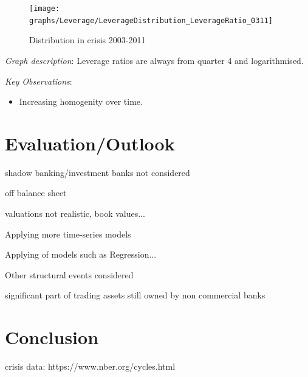 \documentclass[12pt, a4paper]{article} %
\begin{document}
\pagebreak


\begin{figure}[hbtp]
\centering
\caption{Distribution in crisis 2003-2011}
\texttt{[image: graphs/Leverage/LeverageDistribution\_LeverageRatio\_0311]}
\end{figure}

\noindent \textit{Graph description}: Leverage ratios are always from quarter 4 and  logarithmised.

\noindent \textit{Key Observations}:
\begin{itemize}
\item Increasing homogenity over time.
\end{itemize}

\section{Evaluation/Outlook}

shadow banking/investment banks not considered

off balance sheet

valuations not realistic, book values...

Applying more time-series models

Applying of models such as Regression...

Other structural events considered

significant part of trading assets still owned by non commercial banks

\section{Conclusion}





\newpage
\printbibliography[
heading=bibintoc,
title={Bibliography}
]

crisis data: https://www.nber.org/cycles.html



\end{document}
